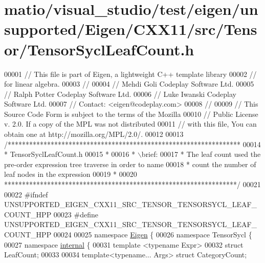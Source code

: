 \hypertarget{matio_2visual__studio_2test_2eigen_2unsupported_2_eigen_2_c_x_x11_2src_2_tensor_2_tensor_sycl_leaf_count_8h_source}{}\section{matio/visual\+\_\+studio/test/eigen/unsupported/\+Eigen/\+C\+X\+X11/src/\+Tensor/\+Tensor\+Sycl\+Leaf\+Count.h}
\label{matio_2visual__studio_2test_2eigen_2unsupported_2_eigen_2_c_x_x11_2src_2_tensor_2_tensor_sycl_leaf_count_8h_source}

\begin{DoxyCode}
00001 \textcolor{comment}{// This file is part of Eigen, a lightweight C++ template library}
00002 \textcolor{comment}{// for linear algebra.}
00003 \textcolor{comment}{//}
00004 \textcolor{comment}{// Mehdi Goli    Codeplay Software Ltd.}
00005 \textcolor{comment}{// Ralph Potter  Codeplay Software Ltd.}
00006 \textcolor{comment}{// Luke Iwanski  Codeplay Software Ltd.}
00007 \textcolor{comment}{// Contact: <eigen@codeplay.com>}
00008 \textcolor{comment}{//}
00009 \textcolor{comment}{// This Source Code Form is subject to the terms of the Mozilla}
00010 \textcolor{comment}{// Public License v. 2.0. If a copy of the MPL was not distributed}
00011 \textcolor{comment}{// with this file, You can obtain one at http://mozilla.org/MPL/2.0/.}
00012 
00013 \textcolor{comment}{/*****************************************************************}
00014 \textcolor{comment}{ * TensorSyclLeafCount.h}
00015 \textcolor{comment}{ *}
00016 \textcolor{comment}{ * \(\backslash\)brief:}
00017 \textcolor{comment}{ *  The leaf count used the pre-order expression tree traverse in order to name}
00018 \textcolor{comment}{ *  count the number of leaf nodes in the expression}
00019 \textcolor{comment}{ *}
00020 \textcolor{comment}{*****************************************************************/}
00021 
00022 \textcolor{preprocessor}{#ifndef UNSUPPORTED\_EIGEN\_CXX11\_SRC\_TENSOR\_TENSORSYCL\_LEAF\_COUNT\_HPP}
00023 \textcolor{preprocessor}{#define UNSUPPORTED\_EIGEN\_CXX11\_SRC\_TENSOR\_TENSORSYCL\_LEAF\_COUNT\_HPP}
00024 
00025 \textcolor{keyword}{namespace }\hyperlink{namespace_eigen}{Eigen} \{
00026 \textcolor{keyword}{namespace }TensorSycl \{
00027 \textcolor{keyword}{namespace }\hyperlink{namespaceinternal}{internal} \{
00031 \textcolor{keyword}{template} <\textcolor{keyword}{typename} Expr>
00032 \textcolor{keyword}{struct }LeafCount;
00033 
00034 \textcolor{keyword}{template}<\textcolor{keyword}{typename}... Args> \textcolor{keyword}{struct }CategoryCount;

\end{DoxyCode}
